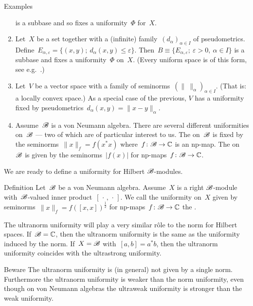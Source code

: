 \documentclass[b]{subfiles}
\begin{document}
\begin{parsec}
\begin{point}{Examples}
\begin{enumerate}
is a subbase and so fixes a uniformity~$\Phi$ for~$X$.
        \item
    Let~$X$ be a set together with a (infinite)
            family~$(d_{\alpha})_{\alpha\in I}$
        of pseudometrics.
    Define~$E_{\alpha,\varepsilon} = \{ (x,y); \ d_\alpha(x,y)
            \leq \varepsilon\}$.
            Then~$B \equiv \{ E_{\alpha,\varepsilon}; \ \varepsilon > 0, \ 
                    \alpha \in I\}$
                    is a subbase and fixes
                    a uniformity~$\Phi$ on~$X$.
(Every uniform space is of this form, see e.g.~\cite[Thm.~39.11]{willard}.)
\item
Let~$V$ be a vector space with a
    family of seminorms~$(\|\  \|_\alpha)_{\alpha \in I}$.
    (That is: a locally convex space.)
As a special case of the previous,
 $V$ has a uniformity fixed by
    pseudometrics~$d_\alpha(x,y) = \|x-y\|_\alpha$.

\item
Assume~$\mathscr{B}$ is a von Neumann algebra.
There are several different uniformities on~$\mathscr{B}$ --- two of which
    are of particular interest to us.
The  on~$\mathscr{B}$
    is fixed by the seminorms~$\|x\|_f = f(x^*x)$
        where~$f\colon \mathscr{B} \to \mathbb{C}$ is an np-map.
The  on~$\mathscr{B}$
    is given by the seminorms~$|f(x)|$
        for np-maps~$f\colon \mathscr{B} \to \mathbb{C}$.

    \end{enumerate}
\begin{point}%
We are ready to define a uniformity for Hilbert $\mathscr{B}$-modules.
\end{point}
\end{point}
\begin{point}[dils-ultranorm]{Definition}%
Let~$\mathscr{B}$ be a von Neumann algebra.
Assume~$X$ is a right $\mathscr{B}$-module
    with~$\mathscr{B}$-valued inner product~$[\,\cdot\,,\,\cdot\,]$.
We call the uniformity on~$X$
    given by seminorms~$\|x\|_f = f([x,x])^{\frac{1}{2}}$
    for np-maps~$f\colon \mathscr{B} \to \mathbb{C}$
    the .
\begin{point}%
The ultranorm uniformity will play a very similar r\^ole
    to the norm for Hilbert spaces.
If~$\mathscr{B}=\mathbb{C}$, then the ultranorm uniformity is
    the same as the uniformity induced by the norm.
If~$X=\mathscr{B}$ with~$[a,b]=a^*b$,
    then the ultranorm uniformity coincides with the ultrastrong uniformity.
\end{point}
\begin{point}{Beware}%
    The ultranorm uniformity is (in general) not given by a single norm.
    Furthermore the ultranorm uniformity is weaker than the norm uniformity,
        even though on von Neumann algebras the ultraweak uniformity
        is stronger than the weak uniformity.
\end{point}
\end{point}
\end{parsec}
\end{document}
